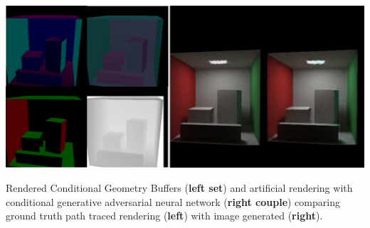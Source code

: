 \documentclass[sigconf]{acmart}%
\begin{document}

\begin{teaserfigure}
  \includegraphics[width=\textwidth]{buffer_results_teaser.png}
  \caption{\textmd{Rendered Conditional Geometry Buffers ({\bf left set}) and artificial rendering with conditional generative adversarial neural network ({\bf right couple}) comparing ground truth path traced rendering ({\bf left}) with image generated ({\bf right}).}}
  \label{teaser}
\end{teaserfigure}

\maketitle
\end{document}
